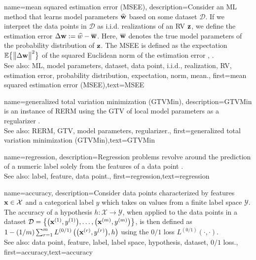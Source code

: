 {name={mean squared estimation error (MSEE)},
	description={Consider an ML method that 
		learns model parameters $\widehat{{\bf w}}$ based on some dataset $\mathcal{D}$. 
		If we interpret the data points in $\mathcal{D}$ as i.i.d. realizations of an RV ${\bf z}$, 
		we define the estimation error $\Delta {\bf w} := \widehat{w} - \overline{{\bf w}}$. 
		Here, $\overline{{\bf w}}$ denotes the true model parameters of the probability distribution 
		of ${\bf z}$. The MSEE is 
		defined as the expectation $\mathbb{E}  \big\{ \big\| \Delta {\bf w} \big\|^{2} \big\}$ of the 
		squared Euclidean norm of the estimation error \cite{LC}, \cite{kay}.
					\\ 
		See also: ML, model parameters, dataset, data point, i.i.d., realization, RV, estimation error, probability distribution, expectation, norm, mean.},
	first={mean squared estimation error (MSEE)},text={MSEE} 
}

{name={generalized total variation minimization (GTVMin)},
	description={GTVMin is an instance of RERM 
		using the GTV of local model parameters as a regularizer \cite{ClusteredFLTVMinTSP}.
					\\ 
		See also: RERM, GTV, model parameters, regularizer.},
	first={generalized total variation minimization (GTVMin)},text={GTVMin} 
}

{name={regression},
	description={Regression problems revolve around the 
		prediction of a numeric label solely from the features of a data point \cite[Ch. 2]{MLBasics}.
					\\ 
		See also: label, feature, data point.},
	first={regression},text={regression} 
}

{name={accuracy},
	description={Consider data points characterized by features ${\bf x} \in \mathcal{X}$ and 
		a categorical label $y$ which takes on values from a finite label space $\mathcal{Y}$. The 
		accuracy of a hypothesis $h: \mathcal{X} \rightarrow \mathcal{Y}$, when applied 
		to the data points in a dataset $\mathcal{D} = \big\{ \big({\bf x}^{(1)}, y^{(1)} \big), \ldots, \big({\bf x}^{(m)},y^{(m)}\big) \big\}$, 
		is then defined as $1 - (1/m)\sum_{r=1}^{m} L^{(0/1)}\left(\big({\bf x}^{(r)},y^{(r)}\big),h \right)$ using the $0/1$ loss $L^{(0/1)}\left(\cdot,\cdot \right)$.
					\\ 
		See also: data point, feature, label, label space, hypothesis, dataset, $0/1$ loss.},
	first={accuracy},text={accuracy} 
}





